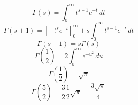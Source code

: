 \documentclass{article}
\begin{document}
\[
\Gamma(s)=\int_0^{\infty}t^{s-1}e^{-t}\,dt
\]
\[
\Gamma(s+1)=\left[-t^se^{-t}\right]_0^{\infty}+s\int_0^{\infty}t^{s-1}e^{-t}\,dt
\]
\[
\Gamma(s+1)=s\Gamma(s)
\]
\[
\Gamma\left(\frac{1}{2}\right)=2\int_0^{\infty}e^{-u^2}\,du
\]
\[
\Gamma\left(\frac{1}{2}\right)=\sqrt{\pi}
\]
\[
\Gamma\left(\frac{5}{2}\right)=\frac{3}{2}\frac{1}{2}\sqrt{\pi}=\frac{3\sqrt{\pi}}{4}
\]
\end{document}
